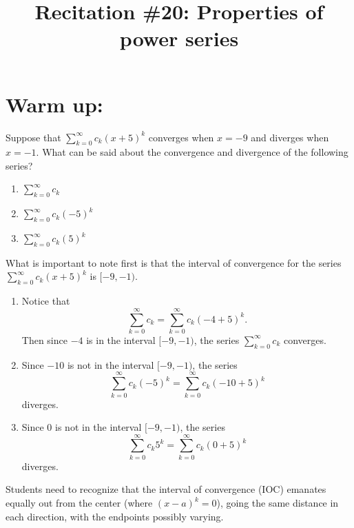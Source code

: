 \documentclass[handout]{ximera}
\title{Recitation \#20: Properties of power series}
\begin{document}
\begin{abstract}		\end{abstract}
\maketitle



\section{Warm up:}
Suppose that $\sum_{k=0}^\infty c_k (x+5)^k$ converges when $x=-9$ and diverges when $x=-1$.  
What can be said about the convergence and divergence of the following series?
	\begin{multicols}{3}
	\begin{enumerate}
	\item  $\sum_{k=0}^\infty c_k$
	\item  $\sum_{k=0}^\infty c_k (-5)^k$
	\item  $\sum_{k=0}^\infty c_k (5)^k$
	\end{enumerate}
	\end{multicols}
	
	\begin{freeResponse}
	 What is important to note first is that the interval of convergence for the series $\sum_{k=0}^\infty c_k (x+5)^k$ is $[-9,-1)$. 
	
	\begin{enumerate}
	\item  Notice that
		\[
		\sum_{k=0}^\infty c_k = \sum_{k=0}^\infty c_k (-4+5)^k.
		\]
	Then since $-4$ is in the interval $[-9,-1)$, the series $\sum_{k=0}^\infty c_k$ converges.
	
	\item  Since $-10$ is not in the interval $[-9,-1)$, the series
		\[
		 \sum_{k=0}^\infty c_k (-5)^k = \sum_{k=0}^\infty c_k (-10+5)^k
		\]
	diverges.
	
	\item  Since $0$ is not in the interval $[-9,-1)$, the series
		\[
		\sum_{k=0}^\infty c_k 5^k = \sum_{k=0}^\infty c_k (0+5)^k
		\]
	diverges.
	\end{enumerate}
	\end{freeResponse}
	
\begin{instructorNotes}
Students need to recognize that the interval of convergence (IOC) emanates equally out from the center (where $(x-a)^k = 0$), going the same distance in each direction, with the endpoints possibly varying.
\end{instructorNotes}
\end{document}
